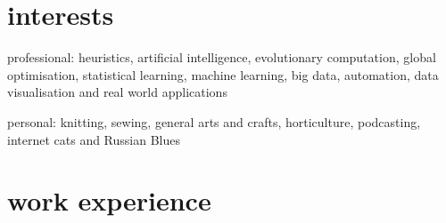 \documentclass[]{cv} %
\begin{document}
\section{interests}
{\boldfont professional:} heuristics, artificial intelligence, evolutionary 
computation, global optimisation, statistical learning, machine learning, big data, automation, data visualisation and real world applications 

{\boldfont personal:} knitting, sewing, general arts and crafts, horticulture,  podcasting, internet cats and Russian Blues

\newpage
\removeaside


\section{work experience}

\end{document}
